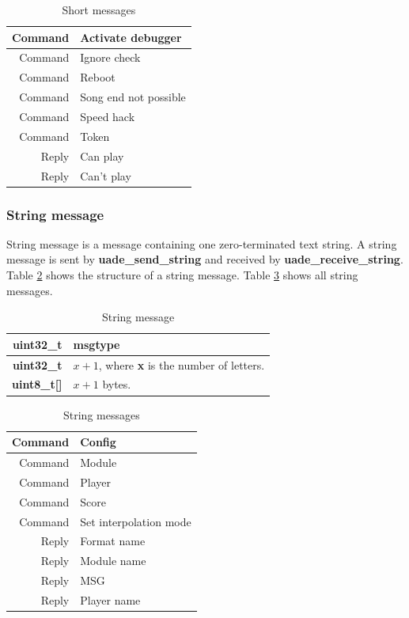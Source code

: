 \documentclass{article}
\begin{document}
\begin{table}
\begin{center}
\caption{Short messages}
\label{tab:short_messages}
\begin{tabular}{|r|l|}
\hline
Command & Activate debugger\\
\hline
Command & Ignore check\\
\hline
Command & Reboot \\
\hline
Command & Song end not possible \\
\hline
Command & Speed hack \\
\hline
Command & Token \\
\hline
Reply & Can play\\
\hline
Reply & Can't play\\
\hline
\end{tabular}
\end{center}
\end{table}

\subsubsection{String message}

String message is a message containing one zero-terminated text string.
A string message is sent by \textbf{uade\_send\_string} and received by
\textbf{uade\_receive\_string}. Table \ref{tab:string_message} shows
the structure of a string message. Table \ref{tab:string_messages} shows
all string messages.

\begin{table}
\begin{center}
\caption{String message}
\label{tab:string_message}
\begin{tabular}{|r|l|}
\hline
\textbf{uint32\_t} & msgtype\\
\hline
\textbf{uint32\_t} & $x + 1$, where \textbf{x} is the number of letters.\\
\hline
\textbf{uint8\_t[]} & $x + 1$ bytes.\\
\hline
\end{tabular}
\end{center}
\end{table}

\begin{table}
\begin{center}
\caption{String messages}
\label{tab:string_messages}
\begin{tabular}{|r|l|}
\hline
Command & Config\\
\hline
Command & Module\\
\hline
Command & Player\\
\hline
Command & Score\\
\hline
Command & Set interpolation mode\\
\hline
Reply & Format name\\
\hline
Reply & Module name\\
\hline
Reply & MSG\\
\hline
Reply & Player name\\
\hline
\end{tabular}
\end{center}
\end{table}
\end{document}
